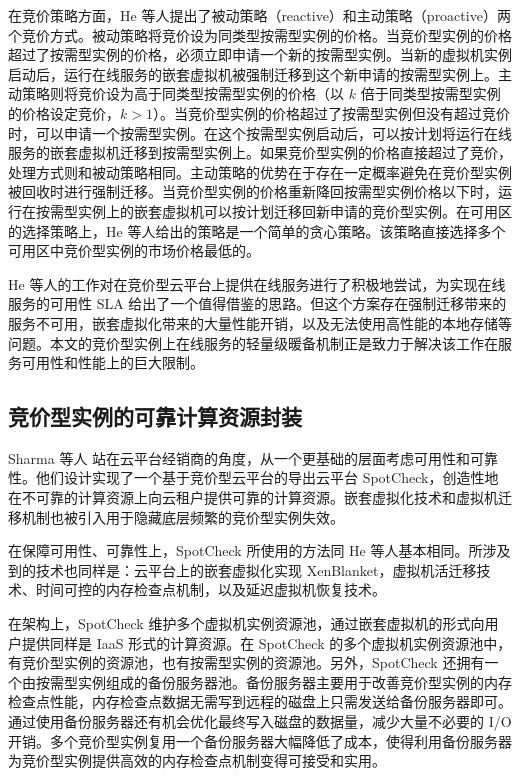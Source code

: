 在竞价策略方面，He 等人提出了被动策略（reactive）和主动策略（proactive）两个竞价方式。被动策略将竞价设为同类型按需型实例的价格。当竞价型实例的价格超过了按需型实例的价格，必须立即申请一个新的按需型实例。当新的虚拟机实例启动后，运行在线服务的嵌套虚拟机被强制迁移到这个新申请的按需型实例上。主动策略则将竞价设为高于同类型按需型实例的价格（以 $k$ 倍于同类型按需型实例的价格设定竞价，$k > 1$）。当竞价型实例的价格超过了按需型实例但没有超过竞价时，可以申请一个按需型实例。在这个按需型实例启动后，可以按计划将运行在线服务的嵌套虚拟机迁移到按需型实例上。如果竞价型实例的价格直接超过了竞价，处理方式则和被动策略相同。主动策略的优势在于存在一定概率避免在竞价型实例被回收时进行强制迁移。当竞价型实例的价格重新降回按需型实例价格以下时，运行在按需型实例上的嵌套虚拟机可以按计划迁移回新申请的竞价型实例。在可用区的选择策略上，He 等人给出的策略是一个简单的贪心策略。该策略直接选择多个可用区中竞价型实例的市场价格最低的。

He 等人的工作对在竞价型云平台上提供在线服务进行了积极地尝试，为实现在线服务的可用性 SLA 给出了一个值得借鉴的思路。但这个方案存在强制迁移带来的服务不可用，嵌套虚拟化带来的大量性能开销，以及无法使用高性能的本地存储等问题。本文的竞价型实例上在线服务的轻量级暖备机制正是致力于解决该工作在服务可用性和性能上的巨大限制。

\subsection{竞价型实例的可靠计算资源封装}
Sharma 等人 \cite{Sharma:2015:SDD:2741948.2741953} 站在云平台经销商的角度，从一个更基础的层面考虑可用性和可靠性。他们设计实现了一个基于竞价型云平台的导出云平台 SpotCheck，创造性地在不可靠的计算资源上向云租户提供可靠的计算资源。嵌套虚拟化技术和虚拟机迁移机制也被引入用于隐藏底层频繁的竞价型实例失效。

在保障可用性、可靠性上，SpotCheck 所使用的方法同 He 等人基本相同。所涉及到的技术也同样是：云平台上的嵌套虚拟化实现 XenBlanket，虚拟机活迁移技术、时间可控的内存检查点机制，以及延迟虚拟机恢复技术。

在架构上，SpotCheck 维护多个虚拟机实例资源池，通过嵌套虚拟机的形式向用户提供同样是 IaaS 形式的计算资源。在 SpotCheck 的多个虚拟机实例资源池中，有竞价型实例的资源池，也有按需型实例的资源池。另外，SpotCheck 还拥有一个由按需型实例组成的备份服务器池。备份服务器主要用于改善竞价型实例的内存检查点性能，内存检查点数据无需写到远程的磁盘上只需发送给备份服务器即可。通过使用备份服务器还有机会优化最终写入磁盘的数据量，减少大量不必要的 I/O 开销。多个竞价型实例复用一个备份服务器大幅降低了成本，使得利用备份服务器为竞价型实例提供高效的内存检查点机制变得可接受和实用。

